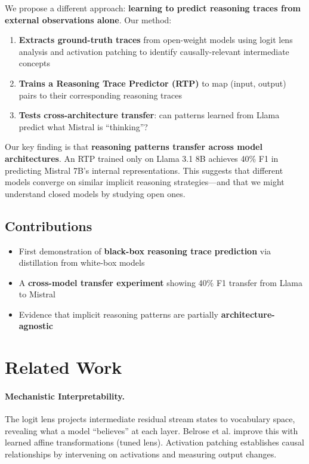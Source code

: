 \documentclass{article}
\begin{document}
We propose a different approach: \textbf{learning to predict reasoning traces from external observations alone}. Our method:

\begin{enumerate}
    \item \textbf{Extracts ground-truth traces} from open-weight models using logit lens analysis and activation patching to identify causally-relevant intermediate concepts
    \item \textbf{Trains a Reasoning Trace Predictor (RTP)} to map (input, output) pairs to their corresponding reasoning traces
    \item \textbf{Tests cross-architecture transfer}: can patterns learned from Llama predict what Mistral is ``thinking''?
\end{enumerate}

Our key finding is that \textbf{reasoning patterns transfer across model architectures}. An RTP trained only on Llama 3.1 8B achieves 40\% F1 in predicting Mistral 7B's internal representations. This suggests that different models converge on similar implicit reasoning strategies---and that we might understand closed models by studying open ones.

\subsection{Contributions}

\begin{itemize}
    \item First demonstration of \textbf{black-box reasoning trace prediction} via distillation from white-box models
    \item A \textbf{cross-model transfer experiment} showing 40\% F1 transfer from Llama to Mistral
    \item Evidence that implicit reasoning patterns are partially \textbf{architecture-agnostic}
\end{itemize}

\section{Related Work}

\paragraph{Mechanistic Interpretability.}
The logit lens \cite{nostalgebraist2020} projects intermediate residual stream states to vocabulary space, revealing what a model ``believes'' at each layer. Belrose et al. \cite{belrose2023} improve this with learned affine transformations (tuned lens). Activation patching \cite{meng2022} establishes causal relationships by intervening on activations and measuring output changes.
\end{document}
